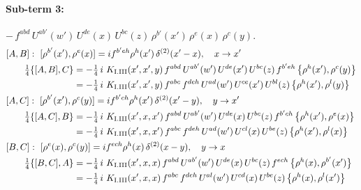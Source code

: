 \documentclass[10pt]{article}
\numberwithin{equation}{section}
\begin{document}
\paragraph{Sub-term 3:} $-\,f^{abd}\,U^{ab'}(w')\,U^{de}(x)\,U^{bc}(z)\,\rho^{b'}(x')\,\rho^{e}(x)\,\rho^{c}(y)$.
\begin{align}
&[A,B]:\ [\rho^{b'}(x'),\rho^{e}(x)]=i f^{b'eh}\rho^{h}(x')\,\delta^{(2)}(x'-x),\quad x\to x'\notag\\
&\qquad \tfrac14\{[A,B],C\}=-\tfrac14\,i\,\,K_{\rm I.III}(x',x',y)\,f^{abd}\,U^{ab'}(w')\,U^{de}(x')\,U^{bc}(z)\,f^{b'eh}\,\big\{\rho^{h}(x'),\rho^{c}(y)\big\}\notag\\
&\qquad\phantom{\tfrac14\{[A,B],C\}}=-\tfrac14\,i\,\,K_{\rm I.III}(x',x',y)\,f^{abc}\,f^{deh}\,U^{ad}(w')\,U^{ce}(x')\,U^{bl}(z)\,\big\{\rho^{h}(x'),\rho^{l}(y)\big\}
\label{eq:GI.III-3-AB}\\
&[A,C]:\ [\rho^{b'}(x'),\rho^{c}(y)]=i f^{b'ch}\rho^{h}(x')\,\delta^{(2)}(x'-y),\quad y\to x'\notag\\
&\qquad \tfrac14\{[A,C],B\}=-\tfrac14\,i\,\,K_{\rm I.III}(x',x,x')\,f^{abd}\,U^{ab'}(w')\,U^{de}(x)\,U^{bc}(z)\,f^{b'ch}\,\big\{\rho^{h}(x'),\rho^{e}(x)\big\}\notag\\
&\qquad\phantom{\tfrac14\{[A,C],B\}}=-\tfrac14\,i\,\,K_{\rm I.III}(x',x,x')\,f^{abc}\,f^{deh}\,U^{ad}(w')\,U^{cl}(x)\,U^{be}(z)\,\big\{\rho^{h}(x'),\rho^{l}(x)\big\}
\label{eq:GI.III-3-AC}\\
&[B,C]:\ [\rho^{e}(x),\rho^{c}(y)]=i f^{ech}\rho^{h}(x)\,\delta^{(2)}(x-y),\quad y\to x\notag\\
&\qquad \tfrac14\{[B,C],A\}=-\tfrac14\,i\,\,K_{\rm I.III}(x',x,x)\,f^{abd}\,U^{ab'}(w')\,U^{de}(x)\,U^{bc}(z)\,f^{ech}\,\big\{\rho^{h}(x),\rho^{b'}(x')\big\}\notag\\
&\qquad\phantom{\tfrac14\{[B,C],A\}}=-\tfrac14\,i\,\,K_{\rm I.III}(x',x,x)\,f^{abc}\,f^{deh}\,U^{al}(w')\,U^{cd}(x)\,U^{be}(z)\,\big\{\rho^{h}(x),\rho^{l}(x')\big\}
\label{eq:GI.III-3-BC}
\end{align}
\end{document}
